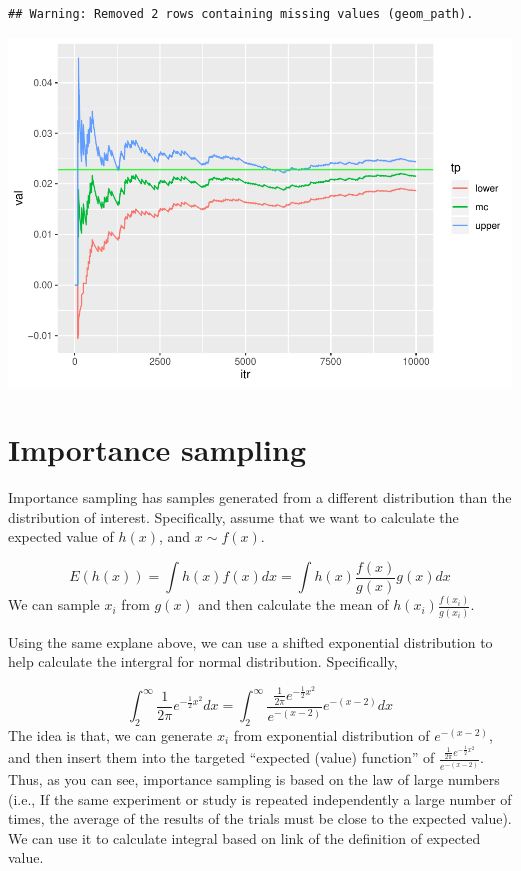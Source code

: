\documentclass[]{book}
\begin{document}
\begin{verbatim}
## Warning: Removed 2 rows containing missing values (geom_path).
\end{verbatim}

\includegraphics{bookdown-demo_files/figure-latex/unnamed-chunk-21-1.pdf}

\hypertarget{importance-sampling}{%
\section{Importance sampling}\label{importance-sampling}}

Importance sampling has samples generated from a different distribution than the distribution of interest. Specifically, assume that we want to calculate the expected value of \(h(x)\), and \(x \sim f(x)\).

\[E(h(x))=\int h(x) f(x) dx = \int h(x) \frac{f(x)}{g(x)} g(x) dx \]
We can sample \(x_i\) from \(g(x)\) and then calculate the mean of \(h(x_i) \frac{f(x_i)}{g(x_i)}\).

Using the same explane above, we can use a shifted exponential distribution to help calculate the intergral for normal distribution. Specifically,

\[\int_2^{\infty} \frac{1}{2 \pi} e^{-\frac{1}{2}x^2}dx = \int_2^{\infty} \frac{\frac{1}{2 \pi} e^{-\frac{1}{2}x^2}}{e^{-(x-2)}} e^{-(x-2)}dx \]
The idea is that, we can generate \(x_i\) from exponential distribution of \(e^{-(x-2)}\), and then insert them into the targeted ``expected (value) function'' of \(\frac{\frac{1}{2 \pi} e^{-\frac{1}{2}x^2}}{e^{-(x-2)}}\). Thus, as you can see, importance sampling is based on the law of large numbers (i.e., If the same experiment or study is repeated independently a large number of times, the average of the results of the trials must be close to the expected value). We can use it to calculate integral based on link of the definition of expected value.
\end{document}
